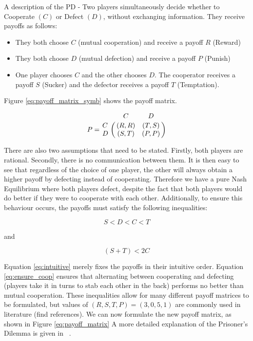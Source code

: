 A description of the PD - Two players simultaneously decide whether to Cooperate $(C)$ or Defect $(D)$, without exchanging information.
They receive payoffs as follows:

\begin{itemize}
\item They both choose $C$ (mutual cooperation) and receive a payoff $R$ (Reward)
\item They both choose $D$ (mutual defection) and receive a payoff $P$ (Punish)
\item One player chooses $C$ and the other chooses $D$. The cooperator receives a payoff $S$ (Sucker) and the defector receives a payoff $T$ (Temptation).
\end{itemize}

Figure \ref{eq:payoff_matrix_symb} shows the payoff matrix.

\begin{equation}\label{eq:payoff_matrix_symb}
%
P = \bordermatrix{~ & C & D \cr
                  C & (R, R) & (T, S) \cr
                  D & (S, T) & (P, P) \cr}
%
\end{equation}

There are also two assumptions that need to be stated.
Firstly, both players are rational.
Secondly, there is no communication between them.
It is then easy to see that regardless of the choice of one player, the other will always obtain a higher payoff by defecting instead of cooperating.
Therefore we have a pure Nash Equilibrium where both players defect, despite the fact that both players would do better if they were to cooperate with each other.
Additionally, to ensure this behaviour occurs, the payoffs must satisfy the following inequalities:

\begin{equation}\label{eq:intuitive}
S < D < C < T
\end{equation}

and

\begin{equation}\label{eq:ensure_coop}
(S + T) < 2 C
\end{equation}

Equation \ref{eq:intuitive} merely fixes the payoffs in their intuitive order.
Equation \ref{eq:ensure_coop} ensures that alternating between cooperating and defecting (players take it in turns to stab each other in the back) performs no better than mutual cooperation.
These inequalities allow for many different payoff matrices to be formulated, but values of $(R, S, T, P) = (3, 0, 5, 1)$ are commonly used in literature (find references). %
We can now formulate the new payoff matrix, as shown in Figure \ref{eq:payoff_matrix}
A more detailed explanation of the Prisoner's Dilemma is given in ~\cite{Gotts2003}.

